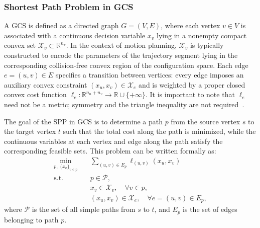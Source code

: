 \subsubsection{Shortest Path Problem in GCS}
\label{subsubsec:spp_gcs}

A GCS is defined as a directed graph $G = (V, E)$, where each vertex
$v \in V$ is associated with a continuous decision variable $x_v$ lying in a
nonempty compact convex set $\mathcal{X}_v \subset \mathbb{R}^{n_v}$. In the
context of motion planning, $\mathcal{X}_v$ is typically constructed to encode the
parameters of the trajectory segment lying in the corresponding collision-free
convex region of the configuration space. Each edge $e = (u, v) \in E$ specifies
a transition between vertices: every edge imposes an auxiliary convex constraint
$(x_u, x_v) \in \mathcal{X}_e$ and is weighted by a proper closed convex cost
function $\ell_e \colon \mathbb{R}^{n_u + n_v} \to \mathbb{R} \cup \{+\infty\}$.
It is important to note that $\ell_e$ need not be a metric; symmetry and the
triangle inequality are not required~\cite{MarcucciEtAl2023GCS}.

The goal of the SPP in GCS is to determine a path $p$ from the source vertex $s$
to the target vertex $t$ such that the total cost along the path is minimized,
while the continuous variables at each vertex and edge along the path satisfy the
corresponding feasible sets. This problem can be written formally as:
\begin{equation}
  \begin{aligned}
    \min_{p,\; \{x_v\}_{v \in p}} \quad
     & \sum_{(u,v) \in E_p} \ell_{(u,v)}(x_u, x_v)                  \\
    \mathrm{s.t.} \quad
     & p \in \mathcal{P},                                           \\
     & x_v \in \mathcal{X}_v, \quad \forall v \in p,                \\
     & (x_u, x_v) \in \mathcal{X}_e, \quad \forall e=(u,v) \in E_p,
  \end{aligned}
  \label{eq:gcs_spp}
\end{equation}
where $\mathcal{P}$ is the set of all simple paths from $s$ to $t$, and $E_p$ is
the set of edges belonging to path $p$.

